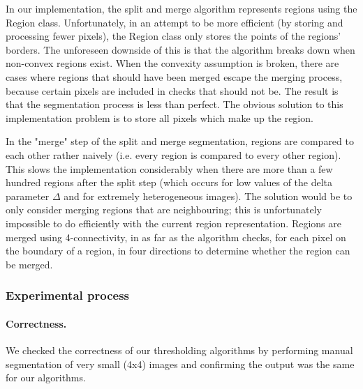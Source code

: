 In our implementation, the split and merge algorithm represents regions using the Region class. Unfortunately, in an attempt to be more efficient (by storing and processing fewer pixels), the Region class only stores the points of the regions' borders. The unforeseen downside of this is that the algorithm breaks down when non-convex regions exist. When the convexity assumption is broken, there are cases where regions that should have been merged escape the merging process, because certain pixels are included in checks that should not be. The result is that the segmentation process is less than perfect. The obvious solution to this implementation problem is to store all pixels which make up the region.

In the "merge" step of the split and merge segmentation, regions are compared to each other rather naively (i.e. every region is compared to every other region). This slows the implementation considerably when there are more than a few hundred regions after the split step (which occurs for low values of the delta parameter $\Delta$ and for extremely heterogeneous images). The solution would be to only consider merging regions that are neighbouring; this is unfortunately impossible to do efficiently with the current region representation. Regions are merged using 4-connectivity, in as far as the algorithm checks, for each pixel on the boundary of a region, in four directions to determine whether the region can be merged.

\subsubsection{Experimental process}

\paragraph{Correctness.}
We checked the correctness of our thresholding algorithms by performing manual segmentation of very small (4x4) images and confirming the output was the same for our algorithms.

